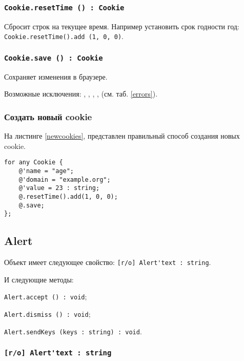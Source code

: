 \subsubsection{\lstinline|Cookie.resetTime () : Cookie|}

Сбросит строк на текущее время. Например установить срок годности год: \lstinline|Cookie.resetTime().add (1, 0, 0)|.

\subsubsection{\lstinline|Cookie.save () : Cookie|}

Сохраняет изменения в браузере.

Возможные исключения: , , , ,  (см. таб. \ref{errors}).

\subsubsection{Создать новый cookie}

На листинге \ref{newcookies}, представлен правильный способ создания новых cookie.

\begin{lstlisting}[caption=Создания новых cookie, label=newcookies]
for any Cookie {
	@'name = "age";
	@'domain = "example.org";
	@'value = 23 : string;
	@.resetTime().add(1, 0, 0);
	@.save;
};
\end{lstlisting}


\subsection{{\color{orange} Alert}}

Объект \alert{} имеет следующее свойство: \lstinline|[r/o] Alert'text : string|.

И следующие методы:
\begin{icItems}
	\item \lstinline|Alert.accept () : void|;
	\item \lstinline|Alert.dismiss () : void|;
	\item \lstinline|Alert.sendKeys (keys : string) : void|.
\end{icItems}

\subsubsection{\lstinline|[r/o] Alert'text : string|}

